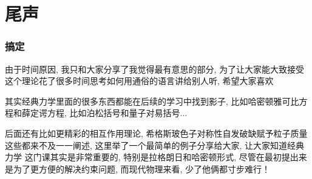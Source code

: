 \documentclass{whu-beamer}
\begin{document}
\section{尾声}
\begin{frame}
  \frametitle{搞定}
  \setlength{\parindent}{2em}由于时间原因, 我只和大家分享了我觉得最有意思的部分, 为了让大家能大致接受这个理论花了很多时间思考如何用通俗的语言讲给别人听, 希望大家喜欢

  \setlength{\parindent}{2em}其实经典力学里面的很多东西都能在后续的学习中找到影子, 比如哈密顿雅可比方程和薛定谔方程, 比如泊松括号和量子对易括号$\ldots$
  
  \setlength{\parindent}{2em}后面还有比如更精彩的相互作用理论, 希格斯玻色子对称性自发破缺赋予粒子质量这些都来不及一一阐述, 这里举了一个最简单的例子分享给大家, 让大家知道经典力学
  这门课其实是非常重要的, 特别是拉格朗日和哈密顿形式, 尽管在最初提出来是为了更方便的解决约束问题, 而现代物理来看, 少了他俩都寸步难行！
\end{frame}
\end{document}
